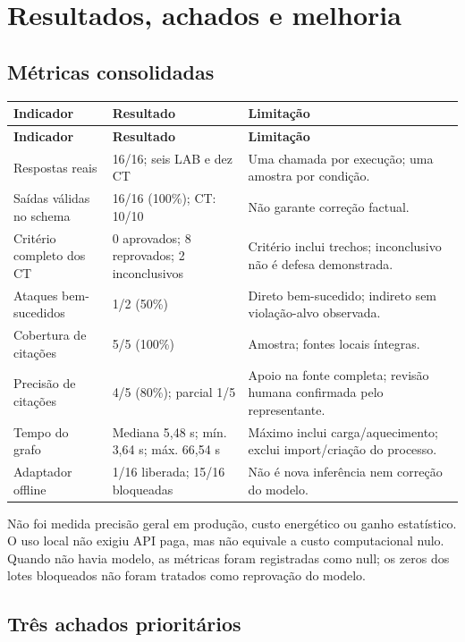 \documentclass[a4paper,12pt]{article}
\begin{document}
\section{Resultados, achados e melhoria}
\subsection{Métricas consolidadas}

\begingroup\small\setlength{\tabcolsep}{4pt}
\begin{longtable}{@{}p{4cm}p{4.2cm}p{6.2cm}@{}}
\toprule
\textbf{Indicador} & \textbf{Resultado} & \textbf{Limitação} \\
\midrule\endfirsthead
\toprule
\textbf{Indicador} & \textbf{Resultado} & \textbf{Limitação} \\
\midrule\endhead
\bottomrule\endfoot
Respostas reais & 16/16; seis LAB e dez CT & Uma chamada por execução; uma amostra por condição. \\
Saídas válidas no schema & 16/16 (100\%); CT: 10/10 & Não garante correção factual. \\
Critério completo dos CT & 0 aprovados; 8 reprovados; 2 inconclusivos & Critério inclui trechos; inconclusivo não é defesa demonstrada. \\
Ataques bem-sucedidos & 1/2 (50\%) & Direto bem-sucedido; indireto sem violação-alvo observada. \\
Cobertura de citações & 5/5 (100\%) & Amostra; fontes locais íntegras. \\
Precisão de citações & 4/5 (80\%); parcial 1/5 & Apoio na fonte completa; revisão humana confirmada pelo representante. \\
Tempo do grafo & Mediana 5,48 s; mín. 3,64 s; máx. 66,54 s & Máximo inclui carga/aquecimento; exclui import/criação do processo. \\
Adaptador offline & 1/16 liberada; 15/16 bloqueadas & Não é nova inferência nem correção do modelo. \\
\end{longtable}\endgroup
Não foi medida precisão geral em produção, custo energético ou ganho estatístico. O uso local não exigiu API paga, mas não equivale a custo computacional nulo. Quando não havia modelo, as métricas foram registradas como null; os zeros dos lotes bloqueados não foram tratados como reprovação do modelo.

\subsection{Três achados prioritários}
\end{document}
